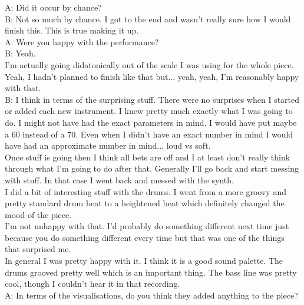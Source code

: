 \documentclass[12pt]{article}
\begin{document}
A: Did it occur by chance?\\

B: Not so much by chance. I got to the end and wasn't really sure how I would finish this. This is true making it up.\\

A: Were you happy with the performance?\\

B: Yeah.\\

I'm actually going didatonically out of the scale I was using for the whole piece.\\

Yeah, I hadn't planned to finish like that but... yeah, yeah, I'm reasonably happy with that.\\

B: I think in terms of the surprising stuff. There were no surprises when I started or added each new instrument. I knew pretty much exactly what I was going to do. I might not have had the exact parameters in mind. I would have put maybe a 60 instead of a 70. Even when I didn't have an exact number in mind I would have had an approximate number in mind... loud vs soft.\\

Once stuff is going then I think all bets are off and I at least don't really think through what I'm going to do after that. Generally I'll go back and start messing with stuff. In that case I went back and messed with the synth.\\

I did a bit of interesting stuff with the drums. I went from a more groovy and pretty standard drum beat to a heightened beat which definitely changed the mood of the piece.\\

I'm not unhappy with that. I'd probably do something different next time just because you do something different every time but that was one of the things that surprised me.\\

In general I was pretty happy with it. I think it is a good sound palette. The drums grooved pretty well which is an important thing. The bass line was pretty cool, though I couldn't hear it in that recording.\\

A: In terms of the visualisations, do you think they added anything to the piece?\\
\end{document}
